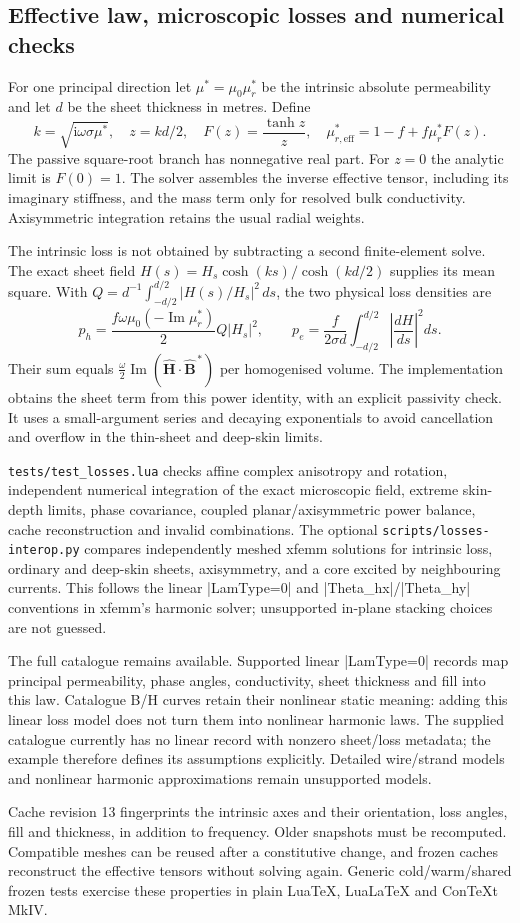 \subsection{Effective law, microscopic losses and numerical checks}
For one principal direction let $\mu^*=\mu_0\mu_r^*$ be the intrinsic absolute
permeability and let $d$ be the sheet thickness in metres. Define
\[
 k=\sqrt{\mathrm i\omega\sigma\mu^*},\quad
 z=kd/2,\quad F(z)=\frac{\tanh z}{z},\quad
 \mu_{r,\mathrm{eff}}^*=1-f+f\mu_r^*F(z).
\]
The passive square-root branch has nonnegative real part. For $z=0$ the
analytic limit is $F(0)=1$. The solver assembles the inverse effective tensor,
including its imaginary stiffness, and the mass term only for resolved bulk
conductivity. Axisymmetric integration retains the usual radial weights.

The intrinsic loss is not obtained by subtracting a second finite-element
solve. The exact sheet field
$H(s)=H_s\cosh(ks)/\cosh(kd/2)$ supplies its mean square. With
$Q=d^{-1}\int_{-d/2}^{d/2}|H(s)/H_s|^2\,ds$, the two physical loss densities are
\[
 p_h=\frac{f\omega\mu_0(-\operatorname{Im}\mu_r^*)}{2}Q|H_s|^2,
 \qquad
 p_e=\frac{f}{2\sigma d}\int_{-d/2}^{d/2}
                    \left|\frac{dH}{ds}\right|^2ds.
\]
Their sum equals
$\tfrac\omega2\operatorname{Im}(\widehat{\mathbf H}\cdot
\widehat{\mathbf B}^{\,*})$ per homogenised volume. The implementation obtains
the sheet term from this power identity, with an explicit passivity check.
It uses a small-argument series and decaying exponentials to avoid cancellation
and overflow in the thin-sheet and deep-skin limits.

\nolinkurl{tests/test_losses.lua} checks affine complex anisotropy and rotation,
independent numerical integration of the exact microscopic field, extreme
skin-depth limits, phase covariance, coupled planar/axisymmetric power balance,
cache reconstruction and invalid combinations. The optional
\nolinkurl{scripts/losses-interop.py} compares independently meshed xfemm solutions
for intrinsic loss, ordinary and deep-skin sheets, axisymmetry, and a core
excited by neighbouring currents. This follows the linear |LamType=0| and
|Theta_hx|/|Theta_hy| conventions in xfemm's harmonic solver; unsupported
in-plane stacking choices are not guessed.

The full catalogue remains available. Supported linear |LamType=0| records
map principal permeability, phase angles, conductivity, sheet thickness and
fill into this law. Catalogue B/H curves retain their nonlinear static meaning:
adding this linear loss model does not turn them into nonlinear harmonic laws.
The supplied catalogue currently has no linear record with nonzero sheet/loss
metadata; the example therefore defines its assumptions explicitly. Detailed
wire/strand models and nonlinear harmonic approximations remain unsupported models.

Cache revision 13 fingerprints the intrinsic axes and their orientation, loss angles, fill and
thickness, in addition to frequency. Older snapshots must be recomputed.
Compatible meshes can be reused after a constitutive change, and frozen caches
reconstruct the effective tensors without solving again. Generic cold/warm/shared
frozen tests exercise these properties in plain LuaTeX, LuaLaTeX and ConTeXt MkIV.
